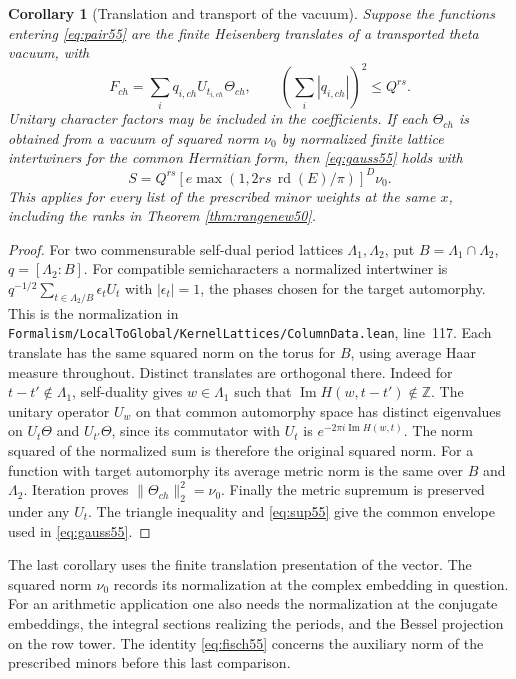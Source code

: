 \documentclass[a4paper,11pt]{article}
\newtheorem{corollary}[proposition]{Corollary}
\theoremstyle{definition}
\theoremstyle{remark}
\newcommand{\ZZ}{\mathbb Z}\newcommand{\ord}{\operatorname{ord}}
\newcommand{\srcloc}[2]{{\small\nolinkurl{#1.lean}}, line~#2}
\numberwithin{equation}{section}
\begin{document}
\begin{corollary}[Translation and transport of the vacuum]\label{cor:move55}
Suppose the functions entering \eqref{eq:pair55} are the finite
Heisenberg translates of a transported theta vacuum, with
\[
         F_{ch}=\sum_i q_{i,ch} U_{t_{i,ch}}\Theta_{ch},
            \qquad \left(\sum_i|q_{i,ch}|\right)^2\le Q^{rs}.
\]
Unitary character factors may be included in the coefficients.
If each \(\Theta_{ch}\) is obtained from a vacuum of squared norm
\(\nu_0\) by normalized finite lattice intertwiners for the common
Hermitian form, then \eqref{eq:gauss55} holds with
\[
           S=Q^{rs}
            [e\max(1,2rs\,\operatorname{rd}(E)/\pi)]^D\nu_0.
\]
This applies for every list of the prescribed minor weights at the
same \(x\), including the ranks in Theorem \ref{thm:rangenew50}.
\end{corollary}
\begin{proof}
For two commensurable self-dual period lattices \(\Lambda_1,\Lambda_2\),
put \(B=\Lambda_1\cap\Lambda_2\), \(q=[\Lambda_2:B]\).
For compatible semicharacters a normalized intertwiner is
\(q^{-1/2}\sum_{t\in\Lambda_2/B}\epsilon_t U_t\) with
\(|\epsilon_t|=1\), the phases chosen for the target automorphy.
This is the normalization in
\srcloc{Formalism/LocalToGlobal/KernelLattices/ColumnData}{117}.
Each translate has the same squared norm on the torus for \(B\),
using average Haar measure throughout. Distinct translates are
orthogonal there. Indeed for \(t-t'\notin\Lambda_1\), self-duality
gives \(w\in\Lambda_1\) such that
\(\operatorname{Im}H(w,t-t')\notin\ZZ\). The unitary operator
\(U_w\) on that common automorphy space has distinct eigenvalues
on \(U_t\Theta\) and \(U_{t'}\Theta\), since its commutator with
\(U_t\) is \(e^{-2\pi i\operatorname{Im}H(w,t)}\).
The norm squared of the normalized sum is therefore the original
squared norm. For a function with target automorphy its average
metric norm is the same over \(B\) and \(\Lambda_2\).
Iteration proves \(\|\Theta_{ch}\|_2^2=\nu_0\). Finally the metric
supremum is preserved under any \(U_t\). The triangle inequality and
\eqref{eq:sup55} give the common envelope used in \eqref{eq:gauss55}.
\end{proof}

The last corollary uses the finite translation presentation of the
vector. The squared norm \(\nu_0\) records its normalization at the
complex embedding in question. For an arithmetic application one
also needs the normalization at the conjugate embeddings, the
integral sections realizing the periods, and the Bessel projection
on the row tower. The identity \eqref{eq:fisch55} concerns the
auxiliary norm of the prescribed minors before this last comparison.
\end{document}
